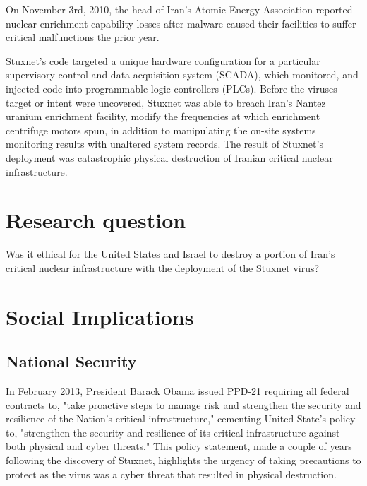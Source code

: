\documentclass[12pt]{article}
\begin{document}
\begin{multicols}{2}
On November 3rd, 2010, the head of Iran's Atomic Energy Association reported nuclear enrichment capability losses after malware caused their facilities to suffer critical malfunctions the prior year.\cite{didStuxnetTakeOut1000Centrifuges} 

Stuxnet's code targeted a unique hardware configuration for a particular supervisory control and data acquisition system (SCADA), which monitored, and injected code into programmable logic controllers (PLCs). Before the viruses target or intent were uncovered, Stuxnet was able to breach Iran's Nantez uranium enrichment facility, modify the frequencies at which enrichment centrifuge motors spun, in addition to manipulating the on-site systems monitoring results with unaltered system records. The result of Stuxnet's deployment was catastrophic physical destruction of Iranian critical nuclear infrastructure.\cite{w32.stuxnetDossier}\cite{lessonsFromStuxnet}


\section{Research question}

Was it ethical for the United States and Israel to destroy a portion of Iran's critical nuclear infrastructure with the deployment of the Stuxnet virus?

\section{Social Implications}

\subsection{National Security}

In February 2013, President Barack Obama issued PPD-21 requiring all federal contracts to, "take proactive steps to manage risk and strengthen the security and resilience of the Nation’s critical infrastructure," cementing United State's policy to, "strengthen the security and resilience of its critical infrastructure against both physical and cyber threats."\cite{industrialCyberVulnerabilities} This policy statement, made a couple of years following the discovery of Stuxnet, highlights the urgency of taking precautions to protect as the virus was a cyber threat that resulted in physical destruction.


\end{multicols}
\end{document}
